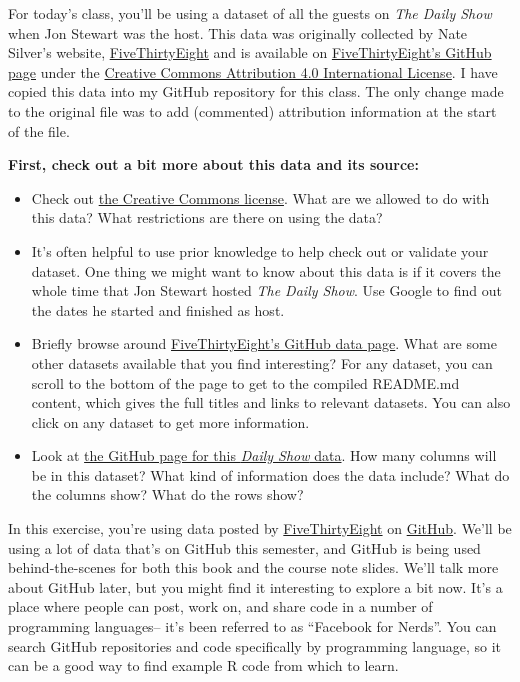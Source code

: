 \documentclass[]{book}
\makeatletter
\providecommand{\tightlist}{%
  \setlength{\itemsep}{0pt}\setlength{\parskip}{0pt}}
\newenvironment{kframe}{%
\medskip{}
\setlength{\fboxsep}{.8em}
 \def\at@end@of@kframe{}%
 \ifinner\ifhmode%
  \def\at@end@of@kframe{\end{minipage}}%
  \begin{minipage}{\columnwidth}%
 \fi\fi%
 \def\FrameCommand##1{\hskip\@totalleftmargin \hskip-\fboxsep
 \colorbox{shadecolor}{##1}\hskip-\fboxsep
     \hskip-\linewidth \hskip-\@totalleftmargin \hskip\columnwidth}%
 \MakeFramed {\advance\hsize-\width
   \@totalleftmargin\z@ \linewidth\hsize
   \@setminipage}}%
 {\par\unskip\endMakeFramed%
 \at@end@of@kframe}
\newenvironment{rmdblock}[1]
  {
  \begin{itemize}
  \renewcommand{\labelitemi}{
    \raisebox{-.7\height}[0pt][0pt]{
      {\setkeys{Gin}{width=3em,keepaspectratio}\texttt{[image: images/\#1]}}
    }
  }
  \setlength{\fboxsep}{1em}
  \begin{kframe}
  \item
  }
  {
  \end{kframe}
  \end{itemize}
  }
\newenvironment{rmdnote}
  {\begin{rmdblock}{note}}
  {\end{rmdblock}}
\theoremstyle{definition}
\theoremstyle{definition}
\theoremstyle{definition}
\theoremstyle{remark}
\makeatother
\begin{document}
For today's class, you'll be using a dataset of all the guests on
\emph{The Daily Show} when Jon Stewart was the host. This data was
originally collected by Nate Silver's website,
\href{http://fivethirtyeight.com}{FiveThirtyEight} and is available on
\href{https://github.com/fivethirtyeight/data/tree/master/daily-show-guests}{FiveThirtyEight's
GitHub page} under the
\href{http://creativecommons.org/licenses/by/4.0/}{Creative Commons
Attribution 4.0 International License}. I have copied this data into my
GitHub repository for this class. The only change made to the original
file was to add (commented) attribution information at the start of the
file.

\textbf{First, check out a bit more about this data and its source:}

\begin{itemize}
\tightlist
\item
  Check out \href{http://creativecommons.org/licenses/by/4.0/}{the
  Creative Commons license}. What are we allowed to do with this data?
  What restrictions are there on using the data?
\item
  It's often helpful to use prior knowledge to help check out or
  validate your dataset. One thing we might want to know about this data
  is if it covers the whole time that Jon Stewart hosted \emph{The Daily
  Show}. Use Google to find out the dates he started and finished as
  host.
\item
  Briefly browse around
  \href{https://github.com/fivethirtyeight/data}{FiveThirtyEight's
  GitHub data page}. What are some other datasets available that you
  find interesting? For any dataset, you can scroll to the bottom of the
  page to get to the compiled README.md content, which gives the full
  titles and links to relevant datasets. You can also click on any
  dataset to get more information.
\item
  Look at
  \href{https://github.com/fivethirtyeight/data/tree/master/daily-show-guests}{the
  GitHub page for this \emph{Daily Show} data}. How many columns will be
  in this dataset? What kind of information does the data include? What
  do the columns show? What do the rows show?
\end{itemize}

\begin{rmdnote}
In this exercise, you're using data posted by
\href{http://fivethirtyeight.com}{FiveThirtyEight} on
\href{https://github.com}{GitHub}. We'll be using a lot of data that's
on GitHub this semester, and GitHub is being used behind-the-scenes for
both this book and the course note slides. We'll talk more about GitHub
later, but you might find it interesting to explore a bit now. It's a
place where people can post, work on, and share code in a number of
programming languages-- it's been referred to as ``Facebook for Nerds''.
You can search GitHub repositories and code specifically by programming
language, so it can be a good way to find example R code from which to
learn.
\end{rmdnote}
\end{document}
